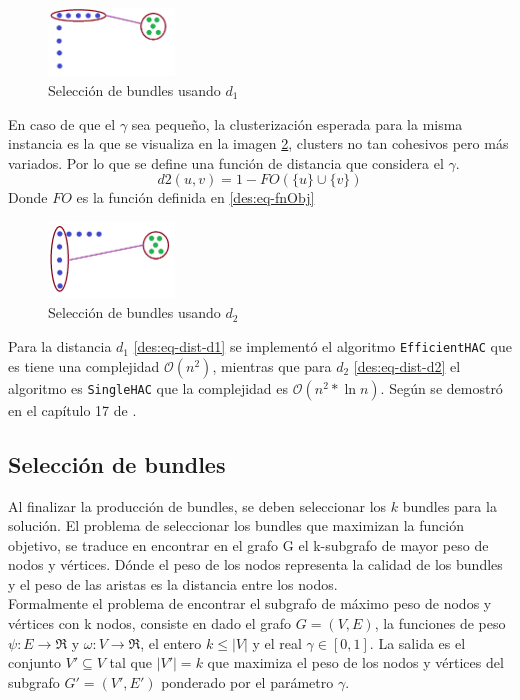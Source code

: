 \begin{figure}[H]
  \centering
    \includegraphics[width=0.3\textwidth]{img/cluster2.png}
  \caption{Selección de bundles usando $d_{1}$}
  \label{des:img-usingEfficientHAC}
\end{figure}

En caso de que el $\gamma$ sea pequeño, la clusterización esperada para la misma instancia es la que se visualiza en la imagen \ref{des:img-usingSingleHAC}, clusters no tan cohesivos pero más variados. Por lo que se define una función de distancia que considera el $\gamma$.\\

\begin{equation} \label{des:eq-dist-d2}
d2(u,v) = 1 - FO(\{u\} \cup \{v\})
\end{equation}
Donde $FO$ es la función definida en \ref{des:eq-fnObj} \\

\begin{figure}[H]
  \centering
    \includegraphics[width=0.3\textwidth]{img/cluster1.png}
  \caption{Selección de bundles usando $d_{2}$}
  \label{des:img-usingSingleHAC}
\end{figure}

Para la distancia $d_{1}$ \ref{des:eq-dist-d1} se implementó el algoritmo \texttt{EfficientHAC} que es tiene una complejidad $\mathcal{O}(n^{2})$, mientras que para $d_{2}$ \ref{des:eq-dist-d2} el algoritmo es \texttt{SingleHAC} que la complejidad es $\mathcal{O}(n^{2} * \ln{n})$. Según se demostró en el capítulo 17 de \cite{informationRetrival}.


\subsection{Selección de bundles}
Al finalizar la producción de bundles, se deben seleccionar los $k$ bundles para la solución. El problema de seleccionar los bundles que maximizan la función objetivo, se traduce en encontrar en el grafo G el k-subgrafo de mayor peso de nodos y vértices. Dónde el peso de los nodos representa la calidad de los bundles y el peso de las aristas es la distancia entre los nodos.\\
Formalmente el problema de encontrar el subgrafo de máximo peso de nodos y vértices con k nodos, consiste en dado el grafo $ G = (V,E) $, la funciones de peso $\psi : E \rightarrow \Re$ y $\omega : V \rightarrow \Re$, el entero $ k \leq |V| $ y el real $\gamma \in [0,1]$. La salida es el conjunto $V' \subseteq V$ tal que $|V'| = k$ que maximiza el peso de los nodos y vértices del subgrafo $G' = (V', E')$ ponderado por el parámetro $\gamma$.

